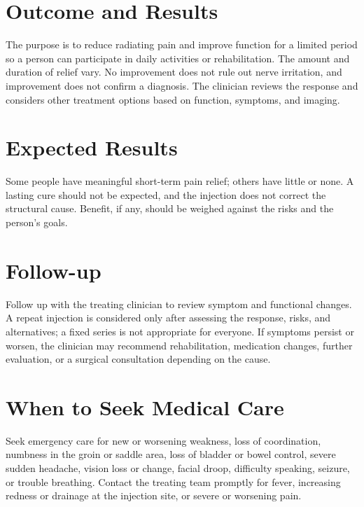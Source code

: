 \section*{Outcome and Results}
The purpose is to reduce radiating pain and improve function for a limited period so a person can participate in daily activities or rehabilitation. The amount and duration of relief vary. No improvement does not rule out nerve irritation, and improvement does not confirm a diagnosis. The clinician reviews the response and considers other treatment options based on function, symptoms, and imaging.

\section*{Expected Results}
Some people have meaningful short-term pain relief; others have little or none. A lasting cure should not be expected, and the injection does not correct the structural cause. Benefit, if any, should be weighed against the risks and the person's goals.

\section*{Follow-up}
Follow up with the treating clinician to review symptom and functional changes. A repeat injection is considered only after assessing the response, risks, and alternatives; a fixed series is not appropriate for everyone. If symptoms persist or worsen, the clinician may recommend rehabilitation, medication changes, further evaluation, or a surgical consultation depending on the cause.

\section*{When to Seek Medical Care}
Seek emergency care for new or worsening weakness, loss of coordination, numbness in the groin or saddle area, loss of bladder or bowel control, severe sudden headache, vision loss or change, facial droop, difficulty speaking, seizure, or trouble breathing. Contact the treating team promptly for fever, increasing redness or drainage at the injection site, or severe or worsening pain.

